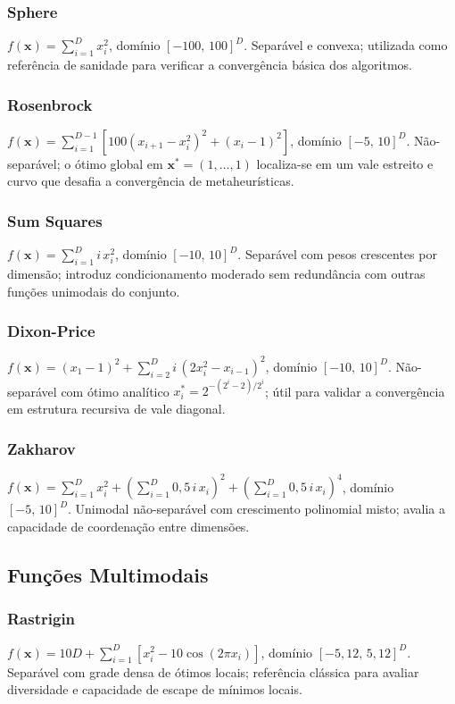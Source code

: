 \documentclass[runningheads]{llncs}
\begin{document}
\subsubsection{Sphere}\leavevmode
$f(\mathbf{x}) = \sum_{i=1}^{D} x_i^2$, domínio $[-100,\,100]^D$.
Separável e convexa; utilizada como referência de sanidade para
verificar a convergência básica dos algoritmos.


\subsubsection{Rosenbrock}\leavevmode
$f(\mathbf{x}) = \sum_{i=1}^{D-1}\left[100(x_{i+1}-x_i^2)^2 +
(x_i-1)^2\right]$, domínio $[-5,\,10]^D$.
Não-separável; o ótimo global em $\mathbf{x}^*=(1,\ldots,1)$
localiza-se em um vale estreito e curvo que desafia a convergência
de metaheurísticas.

\subsubsection{Sum Squares}\leavevmode
$f(\mathbf{x}) = \sum_{i=1}^{D} i\,x_i^2$, domínio $[-10,\,10]^D$.
Separável com pesos crescentes por dimensão; introduz condicionamento
moderado sem redundância com outras funções unimodais do conjunto.

\subsubsection{Dixon-Price}\leavevmode
$f(\mathbf{x}) = (x_1-1)^2 + \sum_{i=2}^{D}
i\,(2x_i^2 - x_{i-1})^2$, domínio $[-10,\,10]^D$.
Não-separável com ótimo analítico
$x_i^* = 2^{-(2^i-2)/2^i}$; útil para validar a convergência
em estrutura recursiva de vale diagonal.


\subsubsection{Zakharov}\leavevmode
$f(\mathbf{x}) = \sum_{i=1}^{D}x_i^2 +
\left(\sum_{i=1}^{D}0{,}5\,i\,x_i\right)^2 +
\left(\sum_{i=1}^{D}0{,}5\,i\,x_i\right)^4$,
domínio $[-5,\,10]^D$.
Unimodal não-separável com crescimento polinomial misto; avalia a
capacidade de coordenação entre dimensões.


\subsection{Fun\c{c}\~{o}es Multimodais}

\subsubsection{Rastrigin}\leavevmode
$f(\mathbf{x}) = 10D + \sum_{i=1}^{D}\left[x_i^2 -
10\cos(2\pi x_i)\right]$, domínio $[-5{,}12,\,5{,}12]^D$.
Separável com grade densa de ótimos locais; referência clássica para
avaliar diversidade e capacidade de escape de mínimos locais.
\end{document}
